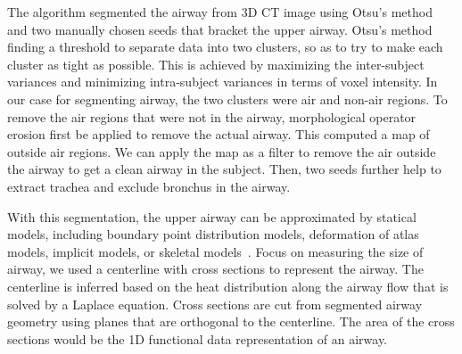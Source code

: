 The algorithm segmented the airway from 3D CT image using Otsu's method and two manually chosen seeds that bracket the upper airway.
Otsu's method finding a threshold to separate data into two clusters, so as to try to make each cluster as tight as possible.
This is achieved by maximizing the inter-subject variances and minimizing intra-subject variances in terms of voxel intensity.
In our case for segmenting airway, the two clusters were air and non-air regions.
To remove the air regions that were not in the airway, morphological operator erosion first be applied to remove the actual airway.
This computed a map of outside air regions.
We can apply the map as a filter to remove the air outside the airway to get a clean airway in the subject.
Then, two seeds further help to extract trachea and exclude bronchus in the airway.

With this segmentation, the upper airway can be approximated by statical models, including boundary point distribution models, deformation of atlas models, implicit models, or skeletal models~\cite{pizer2013nested}.
Focus on measuring the size of airway, we used a centerline with cross sections to represent the airway.
The centerline is inferred based on the heat distribution along the airway flow that is solved by a Laplace equation.
Cross sections are cut from segmented airway geometry using planes that are orthogonal to the centerline. 
The area of the cross sections would be the 1D functional data representation of an airway.

